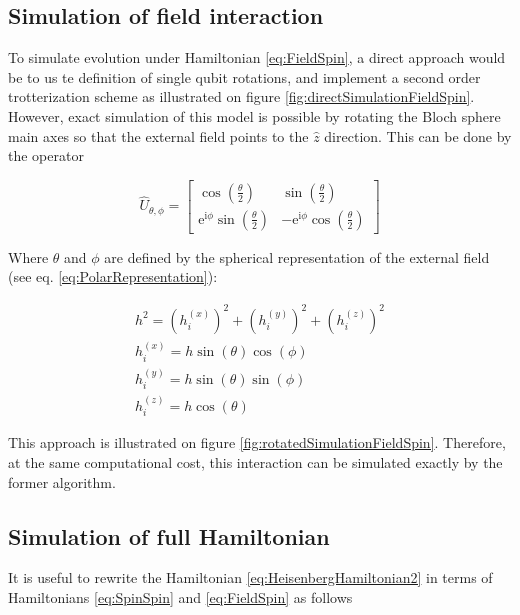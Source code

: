   \subsection{Simulation of field interaction}

  To simulate evolution under Hamiltonian \ref{eq:FieldSpin}, a direct approach would be to us te definition of single qubit rotations, and implement a second order trotterization scheme as illustrated on figure \ref{fig:directSimulationFieldSpin}. However, exact simulation of this model is possible by rotating the Bloch sphere main axes so that the external field points to the $\hat{z}$ direction. This can be done by the operator

  \begin{equation}
    \hat{U}_{\theta,\phi} = \begin{bmatrix}
      \cos(\frac{\theta}{2}) & \sin(\frac{\theta}{2}) \\
      \mathrm{e}^{\mathrm{i}\phi}\sin(\frac{\theta}{2}) & -\mathrm{e}^{\mathrm{i}\phi}\cos(\frac{\theta}{2})
    \end{bmatrix}
    \label{eq:UGate}
  \end{equation}

  Where $\theta$ and $\phi$ are defined by the spherical representation of the external field (see eq. \ref{eq:PolarRepresentation}):

  \begin{gather}
    h^2 =  (h_i^{(x)})^2 + (h_i^{(y)})^2 + (h_i^{(z)})^2 \\
    h_i^{(x)} = h \sin(\theta)\cos(\phi) \\
    h_i^{(y)} = h \sin(\theta)\sin(\phi) \\
    h_i^{(z)} = h \cos(\theta)
    \label{eq:PolarRepresentation}
  \end{gather}

  This approach is illustrated on figure \ref{fig:rotatedSimulationFieldSpin}. Therefore, at the same computational cost, this interaction can be simulated exactly by the former algorithm.

  

  \subsection{Simulation of full Hamiltonian}

  It is useful to rewrite the Hamiltonian \ref{eq:HeisenbergHamiltonian2} in terms of Hamiltonians \ref{eq:SpinSpin} and \ref{eq:FieldSpin} as follows

